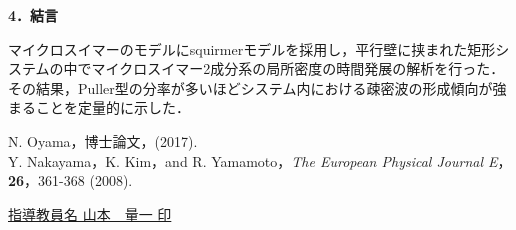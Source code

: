 \documentclass[twocolumns,10pt,a4j]{jarticle}
\begin{document}

  \noindent
  \textbf{\large 4．結言}
  \par
マイクロスイマーのモデルにsquirmerモデルを採用し，平行壁に挟まれた矩形システムの中でマイクロスイマー2成分系の局所密度の時間発展の解析を行った．
その結果，Puller型の分率が多いほどシステム内における疎密波の形成傾向が強まることを定量的に示した．
  \vspace{-7.5truemm}


  \renewcommand{\refname}{\normalsize 参考文献\vspace{-3truemm}}
  \begin{thebibliography}{9}
    N. Oyama，博士論文，(2017).\\
  \vspace{-7truemm}
    Y. Nakayama，K. Kim，and R. Yamamoto，\textit{The European Physical Journal E}，\textbf{26}，361-368 (2008).\\
  \end{thebibliography}


  \vspace{-7truemm}
  \centering
  \underline{指導教員名\hspace{10truemm} 山本　量一 \hspace{20truemm} 印}

\end{document}
